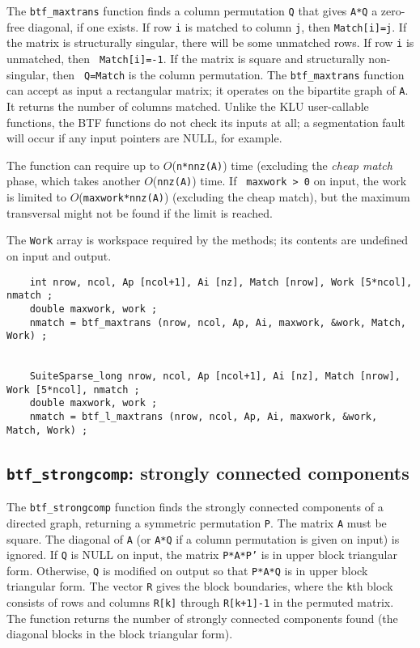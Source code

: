 \documentclass[11pt]{article}
\begin{document}
The {\tt btf\_maxtrans} function finds a column permutation {\tt Q} that gives
{\tt A*Q} a zero-free diagonal, if one exists.  If row {\tt i} is matched to
column {\tt j}, then {\tt Match[i]=j}.  If the matrix is structurally singular,
there will be some unmatched rows.  If row {\tt i} is unmatched, then {\tt
Match[i]=-1}.  If the matrix is square and structurally non-singular, then {\tt
Q=Match} is the column permutation.  The {\tt btf\_maxtrans} function can
accept as input a rectangular matrix; it operates on the bipartite graph of
{\tt A}.  It returns the number of columns matched.  Unlike the KLU
user-callable functions, the BTF functions do not check its inputs at all; a
segmentation fault will occur if any input pointers are NULL, for example.

The function can require up to $O$({\tt n*nnz(A)}) time (excluding the {\em
cheap match} phase, which takes another $O$({\tt nnz(A)}) time.  If {\tt
maxwork > 0} on input, the work is limited to $O$({\tt maxwork*nnz(A)})
(excluding the cheap match), but the maximum transversal might not be found if
the limit is reached.

The {\tt Work} array is workspace required by the methods; its contents
are undefined on input and output.

{\footnotesize
\begin{verbatim}
    int nrow, ncol, Ap [ncol+1], Ai [nz], Match [nrow], Work [5*ncol], nmatch ;
    double maxwork, work ;
    nmatch = btf_maxtrans (nrow, ncol, Ap, Ai, maxwork, &work, Match, Work) ;


    SuiteSparse_long nrow, ncol, Ap [ncol+1], Ai [nz], Match [nrow], Work [5*ncol], nmatch ;
    double maxwork, work ;
    nmatch = btf_l_maxtrans (nrow, ncol, Ap, Ai, maxwork, &work, Match, Work) ;
\end{verbatim}
}

\subsection{{\tt btf\_strongcomp}: strongly connected components}

The {\tt btf\_strongcomp} function finds the strongly connected components of a
directed graph, returning a symmetric permutation {\tt P}.  The matrix {\tt A}
must be square.  The diagonal of {\tt A} (or {\tt A*Q} if a column permutation
is given on input) is ignored.  If {\tt Q} is NULL on input, the matrix
{\tt P*A*P'} is in upper block triangular form.  Otherwise, {\tt Q} is modified
on output so that {\tt P*A*Q} is in upper block triangular form.  The vector
{\tt R} gives the block boundaries, where the {\tt k}th block consists of
rows and columns {\tt R[k]} through {\tt R[k+1]-1} in the permuted matrix.
The function returns the number of strongly connected components found
(the diagonal blocks in the block triangular form).
\end{document}
